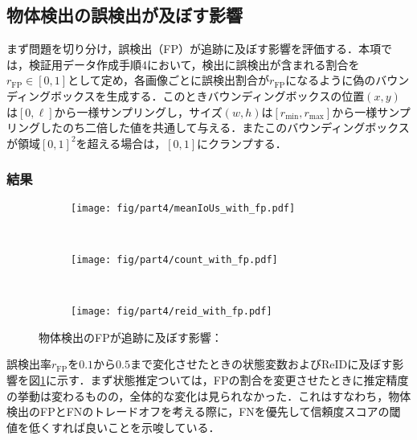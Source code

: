     \subsection{物体検出の誤検出が及ぼす影響}
    \label{subsec:FPeffect}

    まず問題を切り分け，誤検出（FP）が追跡に及ぼす影響を評価する．本項では，検証用データ作成手順4において，検出に誤検出が含まれる割合を$r_{\text{FP}} \in [0, 1]$として定め，各画像ごとに誤検出割合が$r_{\text{FP}}$になるように偽のバウンディングボックスを生成する．このときバウンディングボックスの位置$(x,y)$は$[0, \ell]$から一様サンプリングし，サイズ$(w, h)$は$[r_{\text{min}}, r_{\text{max}}]$から一様サンプリングしたのち二倍した値を共通して与える．またこのバウンディングボックスが領域$[0, 1]^2$を超える場合は，$[0, 1]$にクランプする．

        \subsubsection{結果}

        \begin{figure}[t]
            \begin{subfigure}[t]{\linewidth}
                \centering
                \texttt{[image: fig/part4/meanIoUs\_with\_fp.pdf]}
            \end{subfigure}
            \\
            \begin{subfigure}[t]{\linewidth}
                \centering
                \texttt{[image: fig/part4/count\_with\_fp.pdf]}
            \end{subfigure}
            \\
            \begin{subfigure}[t]{\linewidth}
                \centering
                \texttt{[image: fig/part4/reid\_with\_fp.pdf]}
            \end{subfigure}
            \caption[物体検出のFPが追跡に及ぼす影響]{物体検出のFPが追跡に及ぼす影響：}
            \label{fig:FP_effect}
        \end{figure}

        誤検出率$r_{\text{FP}}$を$0.1$から$0.5$まで変化させたときの状態変数およびReIDに及ぼす影響を図\ref{fig:FP_effect}に示す．まず状態推定ついては，FPの割合を変更させたときに推定精度の挙動は変わるものの，全体的な変化は見られなかった．これはすなわち，物体検出のFPとFNのトレードオフを考える際に，FNを優先して信頼度スコアの閾値を低くすれば良いことを示唆している．

